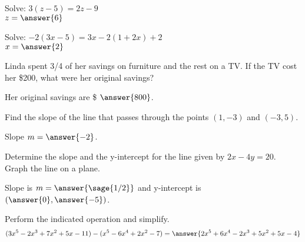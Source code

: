 \documentclass{ximera}
\begin{document}
\begin{problem}
Solve: \hspace{1cm} $3(z-5) = 2z-9$\\

$z=\answer{6}$



\end{problem}



\begin{problem}
Solve: \hspace{1 cm}$ -2(3x-5) = 3x - 2(1 + 2x) + 2$ \\

$x=\answer{2}$

\end{problem}



\begin{problem}
Linda spent 3/4 of her savings on furniture and the rest on a TV. If the TV cost her \$200, what were her original savings? 

Her original savings are \$ $\answer{800}$.



\end{problem}



\begin{problem}
Find the slope of the line that passes through the points $(1,-3)$ and $(-3,5)$.

Slope $m=\answer{-2}$.




\end{problem}



\begin{problem}
Determine the slope and the y-intercept for the line given by $2x - 4y = 20$. Graph the line on a plane.

Slope is $m=\answer{\sage{1/2}}$ and y-intercept is $(\answer{0},\answer{-5})$.


\end{problem}



\begin{problem}
Perform the indicated operation and simplify.
$$(3x^5 - 2x^3 +7x^2+5x -11) - (x^5 - 6x^4 + 2x^2 -7)
=
\answer{2x^5+6x^4-2x^3+5x^2+5x-4}
$$




\end{problem}
\end{document}
